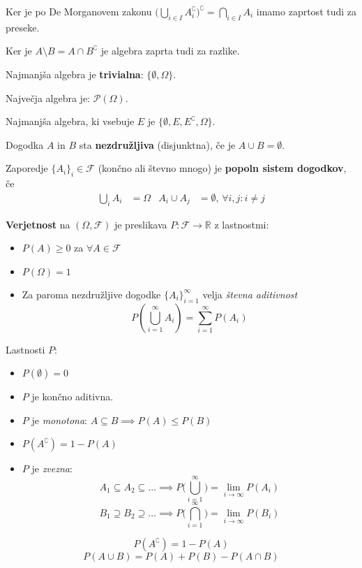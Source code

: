\begin{multicols}{4}
Ker je po De Morganovem zakonu $\big(\bigcup_{i\in I} A_i^\complement \big)^\complement = \bigcap_{i \in I} A_i$ imamo zaprtost tudi za preseke.

Ker je $A \setminus B = A \cap B^\complement$ je algebra zaprta tudi za razlike.

Najmanjša algebra je \textbf{trivialna}: $ \{ \emptyset, \Omega \}$.

Največja algebra je: $\mathcal{P}(\Omega)$.

Najmanjša algebra, ki vsebuje $E$ je $\{ \emptyset, E, E^\complement, \Omega \}$.

Dogodka $A$ in $B$ sta \textbf{nezdružljiva} (disjunktna), če je $A \cup B = \emptyset$.

Zaporedje $\{ A_i \}_i \in \mathcal{F}$ (končno ali števno mnogo) je \textbf{popoln sistem dogodkov}, če
\begin{align*}
	\bigcup_i A_i &= \Omega & A_i \cup A_j &= \emptyset, \, \forall i,j: i\neq j
\end{align*}


\textbf{Verjetnost} na $(\Omega, \mathcal{F})$ je preslikava $P: \mathcal{F} \to \mathbb{R}$ z lastnostmi:

\begin{itemize}
	\item $P(A) \geq 0$ za $\forall A \in \mathcal{F}$
	\item $P(\Omega) = 1$
	\item Za paroma nezdružljive dogodke $\{ A_i \}_{i=1}^\infty $ velja \textit{števna aditivnost}
	\[ P(\bigcup_{i=1}^\infty A_i) = \sum_{i=1}^\infty P(A_i)\]
\end{itemize}

Lastnosti $P$:
\begin{itemize}
	\item $P(\emptyset) = 0$
	\item $P$ je končno aditivna.
	\item $P$ je \textit{monotona}: $A \subseteq B \implies P(A) \leq P(B)$
	\item $P(A^\complement) = 1 - P(A)$
	\item $P$ je \textit{zvezna}:
	\[ A_1 \subseteq A_2 \subseteq \dots \implies P\big(\bigcup_{i=1}^\infty\big) = \lim_{i \to \infty} P(A_i)\]
	\[ B_1 \supseteq B_2 \supseteq \dots \implies P\big(\bigcap_{i=1}^\infty\big) = \lim_{i \to \infty} P(B_i)\]
\end{itemize}


\[P(A^\complement) = 1 - P(A)\]
\[ P(A \cup B) = P(A) + P(B) - P(A \cap B) \]


\end{multicols}
